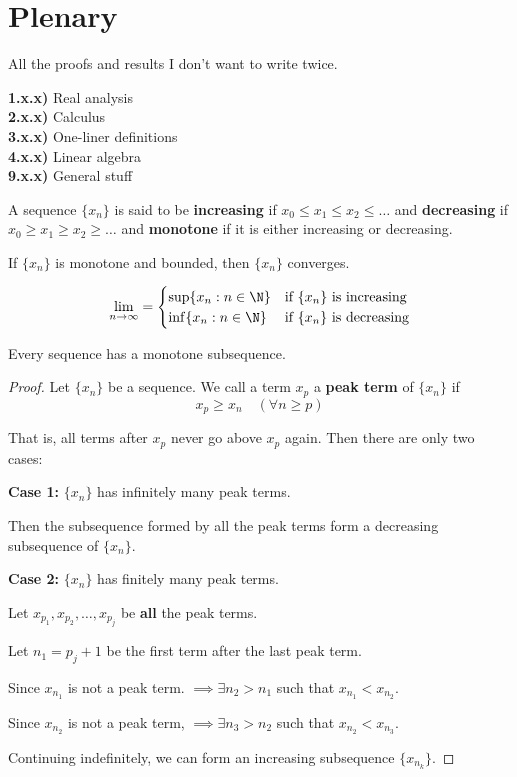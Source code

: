 \section{Plenary}\label{80eeafc}

All the proofs and results I don't want to write twice.

\textbf{1.x.x)} Real analysis \\
\textbf{2.x.x)} Calculus \\
\textbf{3.x.x)} One-liner definitions \\
\textbf{4.x.x)} Linear algebra \\
\textbf{9.x.x)} General stuff \\

\label{d5142a8}

A sequence $\{x_n\}$ is said to be \textbf{increasing} if $x_0\leq
	x_1\leq x_2\leq\ldots$ and \textbf{decreasing} if $x_0\geq x_1\geq
	x_2\geq\ldots$ and \textbf{monotone} if it is either increasing or
decreasing.

\label{ca25eb7}

If $\{x_n\}$ is monotone and bounded, then $\{x_n\}$ converges.

$$
	\lim_{n\to\infty}=\begin{cases}
		\sup\{x_n:n\in\N\} & \text{if $\{x_n\}$ is increasing} \\
		\inf\{x_n:n\in\N\} & \text{if $\{x_n\}$ is decreasing}
	\end{cases}
$$

\label{dddb70e}

Every sequence has a monotone subsequence.

\begin{proof}
	\def\xn{\{x_n\}}

	Let $\xn$ be a sequence. We call a term $x_p$ a \textbf{peak term}
	of $\xn$ if
	$$x_p\geq x_n\quad(\forall n\geq p)$$

	That is, all terms after $x_p$ never go above $x_p$ again. Then
	there are only two cases:

	\textbf{Case 1:} $\xn$ has infinitely many peak terms.

	Then the subsequence formed by all the peak terms form a decreasing
	subsequence of $\xn$.

	\textbf{Case 2:} $\xn$ has finitely many peak terms.

	Let $x_{p_1},x_{p_2},\ldots,x_{p_j}$ be \textbf{all} the peak terms.

	Let $n_1=p_j+1$ be the first term after the last peak term.

	Since $x_{n_1}$ is not a peak term. $\implies\exists n_2>n_1$ such
	that $x_{n_1}<x_{n_2}$.

	Since $x_{n_2}$ is not a peak term, $\implies\exists n_3>n_2$ such
	that $x_{n_2}<x_{n_3}$.

	Continuing indefinitely, we can form an increasing subsequence
	$\{x_{n_k}\}$.
\end{proof}

